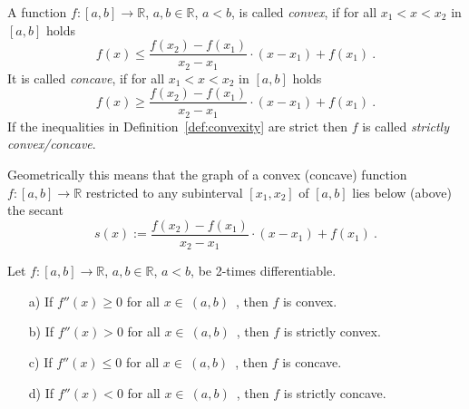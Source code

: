 \begin{Definition} \label{def:convexity}
    A function $f:[a,b]\rightarrow \mathbb{R}$, $a,b\in\mathbb{R}$, $a<b$, is called \emph{convex}, if for all $x_1<x<x_2$ in $[a,b]$ holds
    \begin{equation}\label{eq:convex} 
      f(x) \leq \frac{f(x_2)-f(x_1)}{x_2-x_1}\cdot(x-x_1)+f(x_1)\ .      
    \end{equation}
    It is called \emph{concave}, if for all $x_1<x<x_2$ in $[a,b]$ holds
    \begin{equation}\label{eq:concave} 
      f(x)\geq \frac{f(x_2)-f(x_1)}{x_2-x_1}\cdot(x-x_1)+f(x_1)\ .
    \end{equation}
    If the inequalities in Definition~\ref{def:convexity} are strict then $f$ is called \emph{strictly convex/concave}.
    
Geometrically this means that the graph of a convex (concave) function $f:[a,b]\rightarrow \mathbb{R}$ restricted to any subinterval 
$[x_1,x_2]$ of $[a,b]$ lies 
below (above) the secant $$s(x):=\frac{f(x_2)-f(x_1)}{x_2-x_1}\cdot(x-x_1)+f(x_1) \ .$$
\end{Definition}


\begin{Theorem}{} \label{th:convconc}
    Let $f:[a,b]\rightarrow \mathbb{R}$, $a,b\in\mathbb{R}$, $a<b$, be 2-times differentiable. 
  \begin{enumerate}
   \item[a)]   If $f''(x)\geq 0$ for all $x\in~(a,b)$~, then $f$ is convex.
   \item[b)]   If $f''(x)>0$ for all $x\in~(a,b)$~, then $f$ is strictly convex.
   \item[c)]   If $f''(x)\leq 0$ for all $x\in~(a,b)$~, then $f$ is concave.
   \item[d)]   If $f''(x)<0$ for all $x\in~(a,b)$~, then $f$ is strictly concave.
  \end{enumerate}
\end{Theorem}

